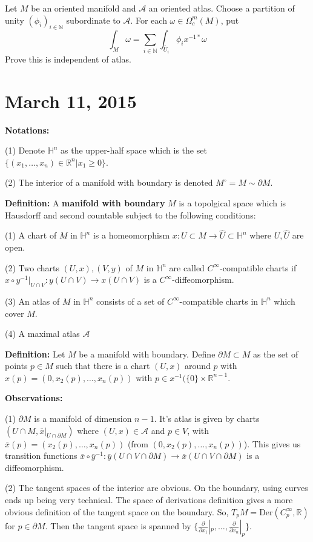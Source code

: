 \documentclass{article}
\begin{document}
Let $M$ be an oriented manifold and $\mathscr{A}$ an oriented atlas. Choose a partition of unity $(\phi_i)_{i \in \mathbb{N}}$ subordinate to $\mathscr{A}$. For each $\omega \in \Omega^m_c(M)$, put 
\[
\int_M \omega = \sum_{i \in \mathbb{N}} \int_{\tilde{U_i}} \phi_ix^{-1*}\omega
\]
Prove this is independent of atlas.

\section{March 11, 2015}
\textbf{Notations:}

(1) Denote $\mathbb{H}^n$ as the upper-half space which is the set $\{ (x_1, \ldots, x_n) \in \mathbb{R}^n | x_1 \geq 0 \}$.

(2) The interior of a manifold with boundary is denoted $M^\circ = M \sim \partial M$.

\textbf{Definition:} A \textbf{manifold with boundary} $M$ is a topolgical space which is Hausdorff and second countable subject to the following conditions: 

(1) A chart of $M$ in $\mathbb{H}^n$ is a homeomorphism $x: U \subset M \to \hat{U} \subset \mathbb{H}^n$ where $U, \hat{U}$ are open.

(2) Two charts $(U, x), (V,y)$ of $M$ in $\mathbb{H}^n$ are called $C^\infty$-compatible charts if $x \circ y^{-1}|_{U \cap V}: y(U \cap V) \to x(U \cap V)$ is a $C^\infty$-diffeomorphism.

(3) An atlas of $M$ in $\mathbb{H}^n$ consists of a set of $C^\infty$-compatible charts in $\mathbb{H}^n$ which cover $M$.

(4) A maximal atlas $\mathscr{A}$

\textbf{Definition:} Let $M$ be a manifold with boundary. Define $\partial M \subset M$ as the set of points $p \in M$ such that there is a chart $(U, x)$ around $p$ with $x(p) = (0, x_2(p), \ldots, x_n(p))$ with $p \in x^{-1}(\{ 0 \}\times \mathbb{R}^{n-1}$.

\textbf{Observations:}

(1) $\partial M$ is a manifold of dimension $n-1$. It's atlas is given by charts $(U\cap M, \bar{x}|_{U \cap \partial M})$ where $(U,x) \in \mathscr{A}$ and $p \in V$, with $\bar{x}(p) = (x_2(p), \ldots, x_n(p))$ (from $(0, x_2(p), \ldots, x_n(p))$). This gives us transition functions $\bar{x} \circ \bar{y}^{-1}: \bar{y}(U \cap V \cap \partial M) \to \bar{x}(U \cap V \cap \partial M)$ is a diffeomorphism.

(2) The tangent spaces of the interior are obvious. On the boundary, using curves ends up being very technical. The space of derivations definition gives a more obvious definition of the tangent space on the boundary. So, $T_pM = \text{Der}(C^\infty_p, \mathbb{R})$ for $p \in \partial M$. Then the tangent space is spanned by $\{ \frac{\partial}{\partial x_1}|_p, \ldots, \frac{\partial}{\partial x_n}|_p \}$.
\end{document}
